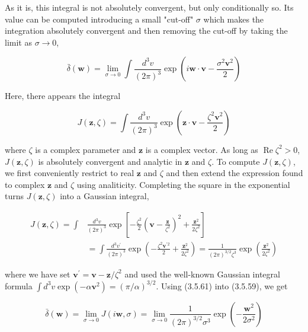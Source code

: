 \documentclass{article}
\begin{document}
As it is, this integral is not absolutely convergent, but only conditionally so. Its value can be computed introducing a small "cut-off" $\sigma$ which makes the integration absolutely convergent and then removing the cut-off by taking the limit as $\sigma \rightarrow 0$,
 
\begin{equation*}
\bar{\delta}(\boldsymbol{w})=\lim _{\sigma \rightarrow 0} \int \frac{d^{3} v}{(2 \pi)^{3}} \exp \left(i \boldsymbol{w} \cdot \boldsymbol{v}-\frac{\sigma^{2} \boldsymbol{v}^{2}}{2}\right) \tag{3.5.59}
\end{equation*}
 

Here, there appears the integral
 
\begin{equation*}
J(\boldsymbol{z}, \zeta)=\int \frac{d^{3} v}{(2 \pi)^{3}} \exp \left(\boldsymbol{z} \cdot \boldsymbol{v}-\frac{\zeta^{2} \boldsymbol{v}^{2}}{2}\right) \tag{3.5.60}
\end{equation*}
 
where $\zeta$ is a complex parameter and $\boldsymbol{z}$ is a complex vector. As long as $\operatorname{Re} \zeta^{2}>0$, $J(\boldsymbol{z}, \zeta)$ is absolutely convergent and analytic in $\boldsymbol{z}$ and $\zeta$. To compute $J(\boldsymbol{z}, \zeta)$, we first conveniently restrict to real $\boldsymbol{z}$ and $\zeta$ and then extend the expression found to complex $\boldsymbol{z}$ and $\zeta$ using analiticity. Completing the square in the exponential turns $J(\boldsymbol{z}, \zeta)$ into
a Gaussian integral,
 
\begin{align*}
J(\boldsymbol{z}, \zeta)=\int & \frac{d^{3} v}{(2 \pi)^{3}} \exp \left[-\frac{\zeta^{2}}{2}\left(\boldsymbol{v}-\frac{\boldsymbol{z}}{\zeta^{2}}\right)^{2}+\frac{\boldsymbol{z}^{2}}{2 \zeta^{2}}\right]  \tag{3.5.61}\\
& =\int \frac{d^{3} v^{\prime}}{(2 \pi)^{3}} \exp \left(-\frac{\zeta^{2} \boldsymbol{v}^{\prime 2}}{2}+\frac{\boldsymbol{z}^{2}}{2 \zeta^{2}}\right)=\frac{1}{(2 \pi)^{3 / 2} \zeta^{3}} \exp \left(\frac{\boldsymbol{z}^{2}}{2 \zeta^{2}}\right)
\end{align*}
 
where we have set $\boldsymbol{v}^{\prime}=\boldsymbol{v}-\boldsymbol{z} / \zeta^{2}$ and used the well-known Gaussian integral formula $\int d^{3} v \exp \left(-\alpha \boldsymbol{v}^{2}\right)=(\pi / \alpha)^{3 / 2}$. Using (3.5.61) into (3.5.59), we get
 
\begin{equation*}
\bar{\delta}(\boldsymbol{w})=\lim _{\sigma \rightarrow 0} J(i \boldsymbol{w}, \sigma)=\lim _{\sigma \rightarrow 0} \frac{1}{(2 \pi)^{3 / 2} \sigma^{3}} \exp \left(-\frac{\boldsymbol{w}^{2}}{2 \sigma^{2}}\right) \tag{3.5.62}
\end{equation*}
 
\end{document}
